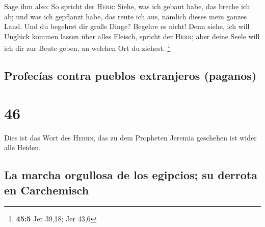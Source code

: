  Sage ihm also: So spricht der \textsc{Herr}: Siehe, was
ich gebaut habe, das breche ich ab; und was ich gepflanzt habe, das
reute ich aus, nämlich dieses mein ganzes Land.  Und du
begehrst dir große Dinge? Begehre es nicht! Denn siehe, ich will Unglück
kommen lassen über alles Fleisch, spricht der \textsc{Herr}; aber deine
Seele will ich dir zur Beute geben, an welchen Ort du ziehest.
\footnote{\textbf{45:5} Jer 39,18; Jer 43,6}

\hypertarget{profecuxedas-contra-pueblos-extranjeros-paganos}{%
\subsection{Profecías contra pueblos extranjeros
(paganos)}\label{profecuxedas-contra-pueblos-extranjeros-paganos}}

\hypertarget{section-45}{%
\section{46}\label{section-45}}

 Dies ist das Wort des \textsc{Herrn}, das zu dem
Propheten Jeremia geschehen ist wider alle Heiden.

\hypertarget{la-marcha-orgullosa-de-los-egipcios-su-derrota-en-carchemisch}{%
\subsection{La marcha orgullosa de los egipcios; su derrota en
Carchemisch}\label{la-marcha-orgullosa-de-los-egipcios-su-derrota-en-carchemisch}}

